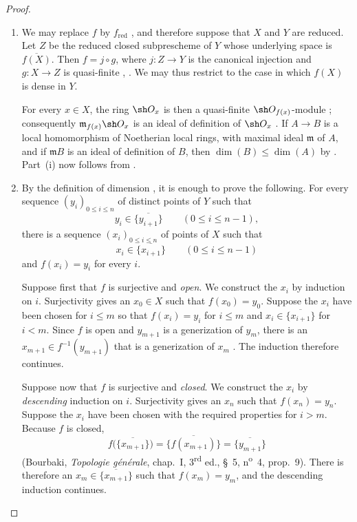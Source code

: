\begin{proof}
\begin{enumerate}[{\rm(i)}]
\item
We may replace $f$ by $f_{\mathrm{red}}$ , and
therefore suppose that $X$ and $Y$ are reduced.
Let $Z$ be the reduced closed subprescheme of $Y$ whose underlying
space is $\overline{f(X)}$.
Then $f=j\circ g$, where $j:Z\to Y$ is the canonical injection and
$g:X\to Z$ is quasi-finite
, .
We may thus restrict to the case in which $f(X)$ is dense in $Y$.

For every $x\in X$, the ring $\sh O_x$ is then a quasi-finite
$\sh O_{f(x)}$-module ; consequently $\mathfrak m_{f(x)}\sh O_x$
is an ideal of definition of $\sh O_x$ .
If $A\to B$ is a local homomorphism of Noetherian local rings, with
maximal ideal $\mathfrak m$ of $A$, and if $\mathfrak mB$ is an ideal
of definition of $B$, then $\dim(B)\leq\dim(A)$
by .
Part~(i) now follows from .

\item
By the definition of dimension , it is enough to
prove the following.
For every sequence $(y_i)_{0\leq i\leq n}$ of distinct points of $Y$
such that
\[
y_i\in\overline{\{y_{i+1}\}}
\qquad(0\leq i\leq n-1),
\]
there is a sequence $(x_i)_{0\leq i\leq n}$ of points of $X$ such
that
\[
x_i\in\overline{\{x_{i+1}\}}
\qquad(0\leq i\leq n-1)
\]
and $f(x_i)=y_i$ for every $i$.

Suppose first that $f$ is surjective and \emph{open}.
We construct the $x_i$ by induction on $i$.
Surjectivity gives an $x_0\in X$ such that $f(x_0)=y_0$.
Suppose the $x_i$ have been chosen for $i\leq m$ so that
$f(x_i)=y_i$ for $i\leq m$ and
$x_i\in\overline{\{x_{i+1}\}}$ for $i<m$.
Since $f$ is open and $y_{m+1}$ is a generization of $y_m$, there is
an $x_{m+1}\in f^{-1}(y_{m+1})$ that is a generization of $x_m$
.
The induction therefore continues.


Suppose now that $f$ is surjective and \emph{closed}.
We construct the $x_i$ by \emph{descending} induction on $i$.
Surjectivity gives an $x_n$ such that $f(x_n)=y_n$.
Suppose the $x_i$ have been chosen with the required properties for
$i>m$.
Because $f$ is closed,
\[
f\bigl(\overline{\{x_{m+1}\}}\bigr)
  =\overline{\{f(x_{m+1})\}}
  =\overline{\{y_{m+1}\}}
\]
(Bourbaki, \emph{Topologie g\'en\'erale}, chap.~I,
3\textsuperscript{rd} ed., \S~5, n\textsuperscript{o}~4, prop.~9).
There is therefore an
$x_m\in\overline{\{x_{m+1}\}}$ such that $f(x_m)=y_m$, and the
descending induction continues.
\end{enumerate}
\end{proof}

